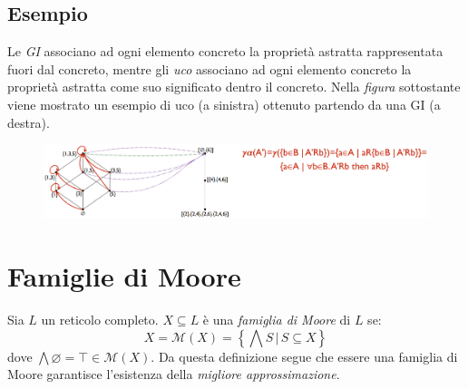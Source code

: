 \documentclass[a4paper,oneside,titlepage]{book}
\begin{document}
\subsection{Esempio}
Le \textit{GI} associano ad ogni elemento concreto la proprietà astratta rappresentata fuori dal concreto, mentre gli \textit{uco} associano ad ogni elemento concreto la proprietà astratta come suo significato dentro il concreto. Nella \textit{figura} sottostante viene mostrato un esempio di uco (a sinistra) ottenuto partendo da una GI (a destra).
\begin{figure}[htp]
	\centering
	\includegraphics[width=\textwidth, height=\textheight, keepaspectratio]{uco.png}
\end{figure}


\section{Famiglie di Moore} %
Sia $L$ un reticolo completo. $X \subseteq L$ è una \textit{famiglia di Moore} di $L$ se:
\[
    X = \mathcal{M}(X) = \left\{ \bigwedge S \, | \, S \subseteq X \right\}
\]
dove $\bigwedge \varnothing = \top \in \mathcal{M}(X)$. Da questa definizione segue che essere una famiglia di Moore garantisce l'esistenza della \textit{migliore approssimazione}.
\end{document}
